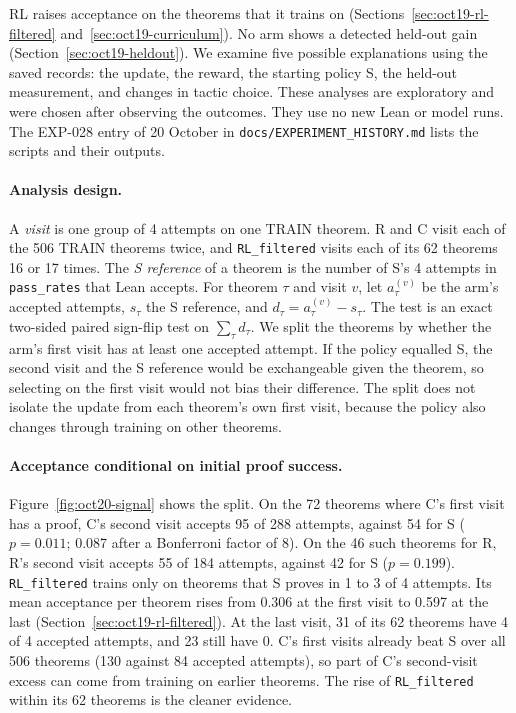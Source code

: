\documentclass[11pt]{article}
\newcommand{\code}[1]{\texttt{#1}}
\newcommand{\pth}[1]{\nolinkurl{#1}}
\begin{document}
RL raises acceptance on the theorems that it trains on (Sections~\ref{sec:oct19-rl-filtered} and~\ref{sec:oct19-curriculum}).
No arm shows a detected held-out gain (Section~\ref{sec:oct19-heldout}).
We examine five possible explanations using the saved records: the update, the reward, the starting policy S, the held-out measurement, and changes in tactic choice.
These analyses are exploratory and were chosen after observing the outcomes. They use no new Lean or model runs.
The EXP-028 entry of 20 October in \pth{docs/EXPERIMENT_HISTORY.md} lists the scripts and their outputs.

\paragraph{Analysis design.}
A \emph{visit} is one group of 4 attempts on one TRAIN theorem.
R and C visit each of the 506 TRAIN theorems twice, and \code{RL\_filtered} visits each of its 62 theorems 16 or 17 times.
The \emph{S reference} of a theorem is the number of S's 4 attempts in \code{pass\_rates} that Lean accepts.
For theorem $\tau$ and visit $v$, let $a^{(v)}_\tau$ be the arm's accepted attempts, $s_\tau$ the S reference, and $d_\tau = a^{(v)}_\tau - s_\tau$.
The test is an exact two-sided paired sign-flip test on $\sum_\tau d_\tau$.
We split the theorems by whether the arm's first visit has at least one accepted attempt.
If the policy equalled S, the second visit and the S reference would be exchangeable given the theorem, so selecting on the first visit would not bias their difference.
The split does not isolate the update from each theorem's own first visit, because the policy also changes through training on other theorems.

\paragraph{Acceptance conditional on initial proof success.}
Figure~\ref{fig:oct20-signal} shows the split.
On the 72 theorems where C's first visit has a proof, C's second visit accepts 95 of 288 attempts, against 54 for S ($p = 0.011$; 0.087 after a Bonferroni factor of 8).
On the 46 such theorems for R, R's second visit accepts 55 of 184 attempts, against 42 for S ($p = 0.199$).
\code{RL\_filtered} trains only on theorems that S proves in 1 to 3 of 4 attempts.
Its mean acceptance per theorem rises from 0.306 at the first visit to 0.597 at the last (Section~\ref{sec:oct19-rl-filtered}).
At the last visit, 31 of its 62 theorems have 4 of 4 accepted attempts, and 23 still have 0.
C's first visits already beat S over all 506 theorems (130 against 84 accepted attempts), so part of C's second-visit excess can come from training on earlier theorems.
The rise of \code{RL\_filtered} within its 62 theorems is the cleaner evidence.
\end{document}
